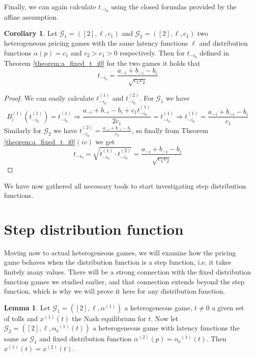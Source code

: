 \documentclass[10pt,a4paper]{book}
\newcommand{\as}{\mathrm{\alpha_s}}
\newcommand{\Gm}{\mathcal{G}}
\theoremstyle{definition}
\newtheorem{lemma}[definition]{Lemma}
\newtheorem{corollary}[definition]{Corollary}
\theoremstyle{comment}
\begin{document}
Finally, we can again calculate $t_{-i_0}$ using the closed formulas provided by the affine assumption.

\begin{corollary}
	\label{corollary:a_fixed_ti0_calc}
	Let $\Gm_1 = ([2], \ell, c_1)$ and $\Gm_2 = ([2], \ell, c_1)$ two heterogeneous pricing games with the same latency functions $\ell$ and distribution functions $\alpha(p) = c_1$ and $c_2 > c_1 > 0$ respectively.
	Then for $t_{-i_0}$ defined in Theorem \ref{theorem:a_fixed_t_i0} for the two games it holds that
	\[t_{-i_0} = \frac{a_{-i} + b_{-i} - b_i}{\sqrt{c_1 c_2}}\]
\end{corollary}

\begin{proof}
	We can easily calculate $t_{-i_0}^{(1)}$ and $t_{-i_0}^{(2)}$.
	For $\Gm_1$ we have
	\[B_i^{(1)}(t_{-i_0}^{(1)}) = t_{-i_0}^{(1)} \Rightarrow \frac{a_{-i} + b_{-i} - b_i + c_1 t_{-i_0}^{(1)}}{2 c_1} = t_{-i_0}^{(1)} \Rightarrow t_{-i_0}^{(1)} = \frac{a_{-i} + b_{-i} - b_i}{c_1}\]
	Similarly for $\Gm_2$ we have $t_{-i_0}^{(2)} = \frac{a_{-i} + b_{-i} - b_i}{c_2}$, so finally from Theorem \ref{theorem:a_fixed_t_i0}$(iv)$ we get
	\[t_{-i_0} = \sqrt{t_{-i_0}^{(1)} \cdot t_{-i_0}^{(2)}} = \frac{a_{-i} + b_{-i} - b_i}{\sqrt{c_1 c_2}}\]
\end{proof}
We have now gathered all necessary tools to start investigating step distribution functions.

\section{Step distribution function}

Moving now to actual heterogeneous games, we will examine how the pricing game behaves when the distribution function is a step function, i.e. it takes finitely many values.
There will be a strong connection with the fixed distribution function games we studied earlier, and that connection extends beyond the step function, which is why we will prove it here for any distribution function.

\begin{lemma}
	\label{lemma:heterogenous_flow_equiv_fixed}
	Let $\Gm_1 = ([2], \ell, \alpha^{(1)})$ a heterogeneous game, $t \ne 0$ a given set of tolls and $x^{(1)}(t)$ the Nash equilibrium for $t$.
	Now let $\Gm_2 = ([2], \ell, \as^{(1)}(t))$ a heterogeneous game with latency functions the same as $\Gm_1$ and fixed distribution function $\alpha^{(2)}(p) = \as^{(1)}(t)$.
	Then $x^{(1)}(t) = x^{(2)}(t)$.
\end{lemma}
\end{document}
